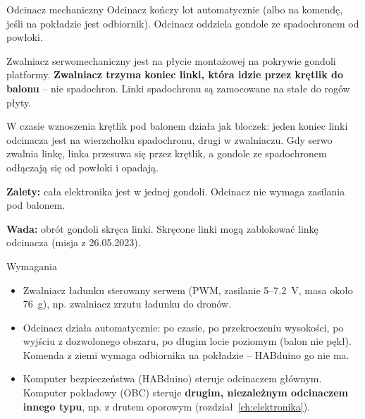 \begin{sekcja}{Odcinacz mechaniczny}\label{sec:odcinacz}
Odcinacz kończy lot automatycznie (albo na komendę, jeśli na pokładzie jest odbiornik). Odcinacz oddziela gondole ze spadochronem od powłoki.

Zwalniacz serwomechaniczny jest na płycie montażowej na pokrywie gondoli platformy. \textbf{Zwalniacz trzyma koniec linki, która idzie przez krętlik do balonu} -- nie spadochron. Linki spadochronu są zamocowane na stałe do rogów płyty.

W czasie wznoszenia krętlik pod balonem działa jak bloczek: jeden koniec linki odcinacza jest na wierzchołku spadochronu, drugi w zwalniaczu. Gdy serwo zwalnia linkę, linka przesuwa się przez krętlik, a gondole ze spadochronem odłączają się od powłoki i opadają.

\textbf{Zalety:} cała elektronika jest w jednej gondoli. Odcinacz nie wymaga zasilania pod balonem.

\textbf{Wada:} obrót gondoli skręca linki. Skręcone linki mogą zablokować linkę odcinacza (misja z 26.05.2023).

\end{sekcja}

\begin{podsekcja}{Wymagania}
\begin{itemize}
  \item Zwalniacz ładunku sterowany serwem (PWM, zasilanie 5--\SI{7.2}{V}, masa około \SI{76}{g}), np. zwalniacz zrzutu ładunku do dronów.
  \item Odcinacz działa automatycznie: po czasie, po przekroczeniu wysokości, po wyjściu z dozwolonego obszaru, po długim locie poziomym (balon nie pękł). Komenda z ziemi wymaga odbiornika na pokładzie -- HABduino go nie ma.
  \item Komputer bezpieczeństwa (HABduino) steruje odcinaczem głównym. Komputer pokładowy (OBC) steruje \textbf{drugim, niezależnym odcinaczem innego typu}, np. z drutem oporowym (rozdział~\ref{ch:elektronika}).
\end{itemize}
\end{podsekcja}

